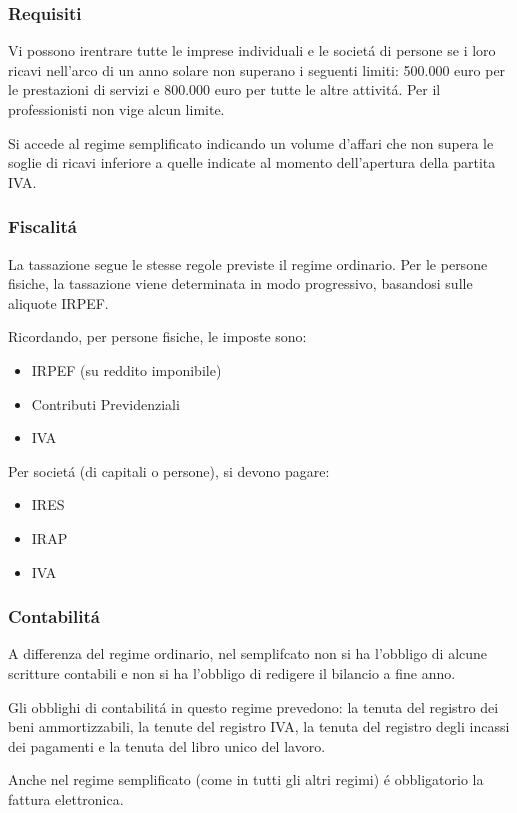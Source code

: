 \documentclass{article}
\begin{document}
\subsubsection{Requisiti}
Vi possono irentrare tutte le imprese individuali e le societ\'a di persone se i loro ricavi nell'arco di un anno solare 
non superano i seguenti limiti: 500.000 euro per le prestazioni di servizi e 800.000 euro per tutte le altre attivit\'a.
Per il professionisti non vige alcun limite.

Si accede al regime semplificato indicando un volume d'affari che non supera le soglie di ricavi inferiore a quelle indicate al momento dell'apertura della partita IVA.

\subsubsection{Fiscalit\'a}
La tassazione segue le stesse regole previste il regime ordinario. Per le persone fisiche, la tassazione viene determinata in modo progressivo, basandosi sulle aliquote IRPEF.

Ricordando, per persone fisiche, le imposte sono:
\begin{itemize}
    \item IRPEF (su reddito imponibile)
    \item Contributi Previdenziali
    \item IVA
\end{itemize}

Per societ\'a (di capitali o persone), si devono pagare:
\begin{itemize}
    \item IRES
    \item IRAP
    \item IVA
\end{itemize}

\subsubsection{Contabilit\'a}
A differenza del regime ordinario, nel semplifcato non si ha l'obbligo di alcune scritture contabili e non si ha l'obbligo di redigere il bilancio a fine anno.

Gli obblighi di contabilit\'a in questo regime prevedono: la tenuta del registro dei beni ammortizzabili, la tenute del registro IVA, la tenuta del registro degli incassi dei pagamenti e la tenuta del libro unico del lavoro. 

Anche nel regime semplificato (come in tutti gli altri regimi) \'e obbligatorio la fattura elettronica.
\end{document}
